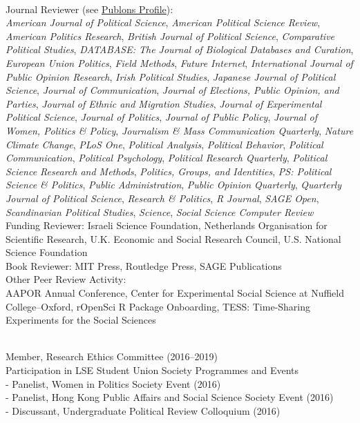 \documentclass[12pt]{article}
\renewcommand{\section}[1]{\pagebreak[3]%
    \llap{\scshape\smash{\parbox[t]{\marginparwidth}{\raggedright {\color{lg}#1}}}}%
    \vspace{-\baselineskip}\par}
\newcommand{\topic}[1]{\pagebreak[3]\indent {\color{lg}{\footnotesize #1 }}\\}
\newcommand{\entry}[1]{\indent {\color{lg}\guillemotright}\hspace{2pt}#1\vspace{.25em}\\}
\newcommand{\subentry}[1]{{\color{lg}-} #1\vspace{.25em}\\}
\begin{document}
\topic{Peer Review Activity}
	\entry{Journal Reviewer (see \href{https://publons.com/a/634082/}{Publons Profile}):\\\textit{American Journal of Political Science}, \textit{American Political Science Review}, \textit{American Politics Research}, \textit{British Journal of Political Science}, \textit{Comparative Political Studies}, \textit{DATABASE: The Journal of Biological Databases and Curation}, \textit{European Union Politics}, \textit{Field Methods}, \textit{Future Internet}, \textit{International Journal of Public Opinion Research}, \textit{Irish Political Studies}, \textit{Japanese Journal of Political Science}, \textit{Journal of Communication}, \textit{Journal of Elections, Public Opinion, and Parties}, \textit{Journal of Ethnic and Migration Studies}, \textit{Journal of Experimental Political Science}, \textit{Journal of Politics}, \textit{Journal of Public Policy}, \textit{Journal of Women, Politics \& Policy}, \textit{Journalism \& Mass Communication Quarterly}, \textit{Nature Climate Change}, \textit{PLoS One}, \textit{Political Analysis}, \textit{Political Behavior}, \textit{Political Communication}, \textit{Political Psychology}, \textit{Political Research Quarterly}, \textit{Political Science Research and Methods}, \textit{Politics, Groups, and Identities}, \textit{PS: Political Science \& Politics}, \textit{Public Administration}, \textit{Public Opinion Quarterly}, \textit{Quarterly Journal of Political Science}, \textit{Research \& Politics}, \textit{R Journal}, \textit{SAGE Open}, \textit{Scandinavian Political Studies}, \textit{Science}, \textit{Social Science Computer Review}}
	\entry{Funding Reviewer: Israeli Science Foundation, Netherlands Organisation for Scientific Research, U.K. Economic and Social Research Council, U.S. National Science Foundation}
	\entry{Book Reviewer: MIT Press, Routledge Press, SAGE Publications}
	\entry{Other Peer Review Activity:\\ AAPOR Annual Conference, Center for Experimental Social Science at Nuffield College--Oxford, rOpenSci R Package Onboarding, TESS: Time-Sharing Experiments for the Social Sciences}

\section{Institutional\\ \& Professional Service}
\topic{Institutional (London School of Economics and Political Science)}
	\entry{Member, Research Ethics Committee (2016--2019)}
	\entry{Participation in LSE Student Union Society Programmes and Events}
        \subentry{Panelist, Women in Politics Society Event (2016)}
        \subentry{Panelist, Hong Kong Public Affairs and Social Science Society Event (2016)}
        \subentry{Discussant, Undergraduate Political Review Colloquium (2016)}
	
\end{document}
